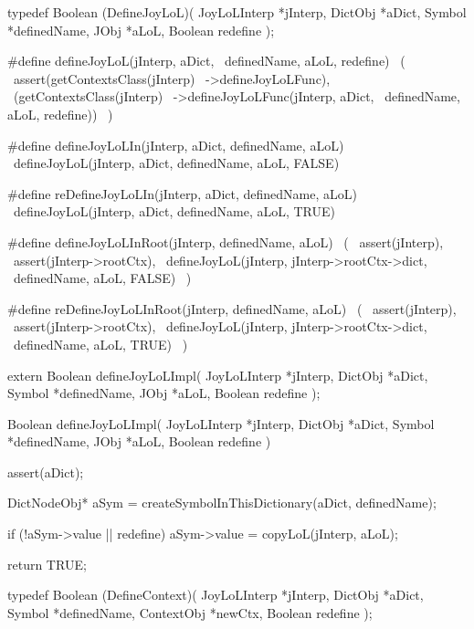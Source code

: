 \startCHeader
typedef Boolean (DefineJoyLoL)(
  JoyLoLInterp *jInterp,
  DictObj      *aDict,
  Symbol       *definedName,
  JObj         *aLoL,
  Boolean       redefine
);

#define defineJoyLoL(jInterp, aDict,      \
  definedName, aLoL, redefine)            \
  (                                       \
    assert(getContextsClass(jInterp)      \
      ->defineJoyLoLFunc),                \
    (getContextsClass(jInterp)            \
      ->defineJoyLoLFunc(jInterp, aDict,  \
        definedName, aLoL, redefine))     \
  )

#define defineJoyLoLIn(jInterp, aDict, definedName, aLoL) \
  defineJoyLoL(jInterp, aDict, definedName, aLoL, FALSE)

#define reDefineJoyLoLIn(jInterp, aDict, definedName, aLoL) \
  defineJoyLoL(jInterp, aDict, definedName, aLoL, TRUE)

#define defineJoyLoLInRoot(jInterp, definedName, aLoL)  \
  (                                                     \
    assert(jInterp),                                    \
    assert(jInterp->rootCtx),                           \
    defineJoyLoL(jInterp, jInterp->rootCtx->dict,       \
      definedName, aLoL, FALSE)                         \
  )

#define reDefineJoyLoLInRoot(jInterp, definedName, aLoL)  \
  (                                                       \
    assert(jInterp),                                      \
    assert(jInterp->rootCtx),                             \
    defineJoyLoL(jInterp, jInterp->rootCtx->dict,         \
      definedName, aLoL, TRUE)                            \
  )
\stopCHeader

\setCHeaderStream{private}
\startCHeader
extern Boolean defineJoyLoLImpl(
  JoyLoLInterp *jInterp,
  DictObj      *aDict,
  Symbol       *definedName,
  JObj         *aLoL,
  Boolean       redefine
);
\stopCHeader
\setCHeaderStream{public}

\startCCode
Boolean defineJoyLoLImpl(
  JoyLoLInterp *jInterp,
  DictObj      *aDict,
  Symbol       *definedName,
  JObj         *aLoL,
  Boolean       redefine
) {
  assert(aDict);
  
  DictNodeObj* aSym =
    createSymbolInThisDictionary(aDict, definedName);

  if (!aSym->value || redefine) {
    aSym->value = copyLoL(jInterp, aLoL);
  }

  return TRUE;
}
\stopCCode

\startCHeader
typedef Boolean (DefineContext)(
  JoyLoLInterp *jInterp,
  DictObj      *aDict,
  Symbol       *definedName,
  ContextObj   *newCtx,
  Boolean       redefine
);

